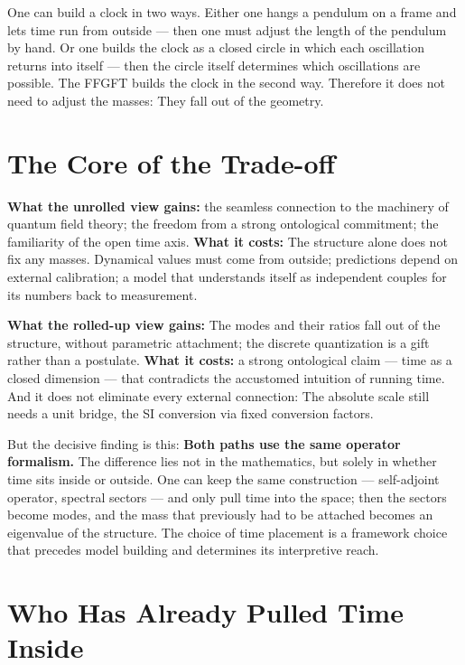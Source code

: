 \begin{laierspur}
One can build a clock in two ways. Either one hangs a
pendulum on a frame and lets time run from outside --- then
one must adjust the length of the pendulum by hand. Or one builds the
clock as a closed circle in which each oscillation returns into itself
--- then the circle itself determines which oscillations are possible.
The FFGFT builds the clock in the second way. Therefore it does not need
to adjust the masses: They fall out of the geometry.
\end{laierspur}

\section{The Core of the Trade-off}

\textbf{What the unrolled view gains:} the seamless connection to
the machinery of quantum field theory; the freedom from a strong
ontological commitment; the familiarity of the open time axis.
\textbf{What it costs:} The structure alone does not fix any masses.
Dynamical values must come from outside; predictions depend on
external calibration; a model that understands itself as independent
couples for its numbers back to measurement.

\textbf{What the rolled-up view gains:} The modes and their
ratios fall out of the structure, without parametric attachment; the
discrete quantization is a gift rather than a postulate. \textbf{What it
costs:} a strong ontological claim --- time as a closed
dimension --- that contradicts the accustomed intuition of running time.
And it does not eliminate every external connection: The absolute
scale still needs a unit bridge, the SI conversion via fixed
conversion factors.

But the decisive finding is this: \textbf{Both paths use
the same operator formalism.} The difference lies not in the
mathematics, but solely in whether time sits inside or outside.
One can keep the same construction --- self-adjoint operator,
spectral sectors --- and only pull time into the space;
then the sectors become modes, and the mass that previously had to be attached
becomes an eigenvalue of the structure. The choice of
time placement is a framework choice that precedes model building and
determines its interpretive reach.

\section{Who Has Already Pulled Time Inside}

